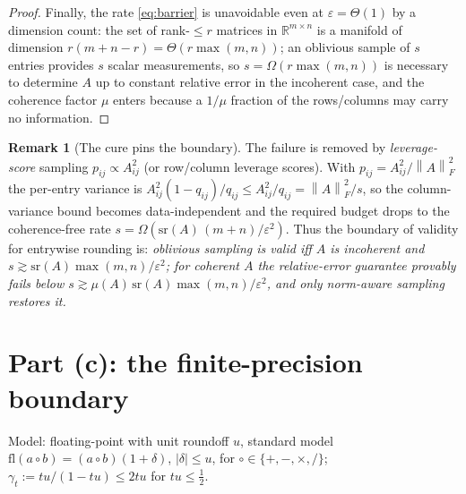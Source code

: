 \documentclass{amsart}
\theoremstyle{definition}
\newtheorem{remark}{Remark}
\newcommand{\R}{\mathbb{R}}
\newcommand{\Frob}[1]{\left\lVert #1\right\rVert_F}
\begin{document}
\begin{proof}
Finally, the rate \eqref{eq:barrier} is unavoidable even at $\varepsilon=\Theta(1)$
by a dimension count: the set of rank-$\le r$ matrices in $\R^{m\times n}$ is a
manifold of dimension $r(m+n-r)=\Theta(r\max(m,n))$; an oblivious sample of $s$
entries provides $s$ scalar measurements, so $s=\Omega(r\max(m,n))$ is necessary
to determine $A$ up to constant relative error in the incoherent case, and the
coherence factor $\mu$ enters because a $1/\mu$ fraction of the rows/columns may
carry no information.
\end{proof}

\begin{remark}[The cure pins the boundary]\label{rem:cure}
The failure is removed by \emph{leverage-score} sampling $p_{ij}\propto A_{ij}^2$
(or row/column leverage scores). With $p_{ij}=A_{ij}^2/\Frob{A}^2$ the per-entry
variance is $A_{ij}^2(1-q_{ij})/q_{ij}\le A_{ij}^2/q_{ij}=\Frob{A}^2/s$, so the
column-variance bound becomes data-independent and the required budget drops to
the coherence-free rate $s=\Omega(\mathrm{sr}(A)\,(m+n)/\varepsilon^2)$. Thus
the boundary of validity for entrywise rounding is: \emph{oblivious sampling is
valid iff $A$ is incoherent and $s\gtrsim\mathrm{sr}(A)\max(m,n)/\varepsilon^2$;
for coherent $A$ the relative-error guarantee provably fails below
$s\gtrsim\mu(A)\,\mathrm{sr}(A)\max(m,n)/\varepsilon^2$, and only norm-aware
sampling restores it.}
\end{remark}

\section{Part (c): the finite-precision boundary}

Model: floating-point with unit roundoff $u$, standard model
$\mathrm{fl}(a\circ b)=(a\circ b)(1+\delta)$, $|\delta|\le u$, for
$\circ\in\{+,-,\times,/\}$; $\gamma_t:=tu/(1-tu)\le2tu$ for $tu\le\tfrac12$.
\end{document}
